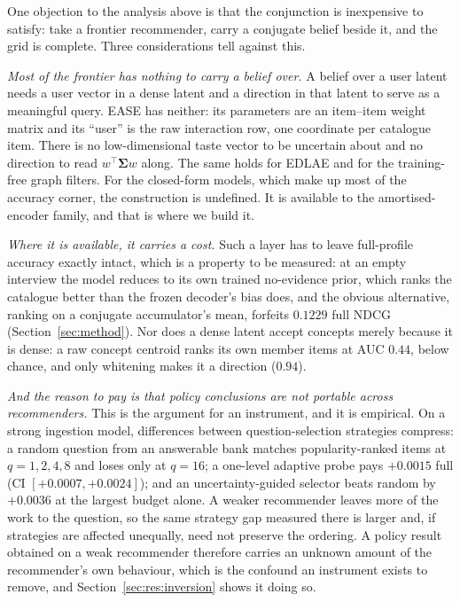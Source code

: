\documentclass[manuscript,screen,review]{acmart}
\newcommand{\bSigma}{\boldsymbol{\Sigma}}
\begin{document}
One objection to the analysis above is that the conjunction is inexpensive to satisfy: take a frontier recommender, carry a conjugate belief beside it, and the grid is complete. Three considerations tell against this.

\emph{Most of the frontier has nothing to carry a belief over.} A belief over a user latent needs a user vector in a dense latent and a direction in that latent to serve as a meaningful query. EASE has neither: its parameters are an item--item weight matrix and its ``user'' is the raw interaction row, one coordinate per catalogue item. There is no low-dimensional taste vector to be uncertain about and no direction to read $w^\top\bSigma w$ along. The same holds for EDLAE and for the training-free graph filters. For the closed-form models, which make up most of the accuracy corner, the construction is undefined. It is available to the amortised-encoder family, and that is where we build it.

\emph{Where it is available, it carries a cost.} Such a layer has to leave full-profile accuracy exactly intact, which is a property to be measured: at an empty interview the model reduces to its own trained no-evidence prior, which ranks the catalogue better than the frozen decoder's bias does, and the obvious alternative, ranking on a conjugate accumulator's mean, forfeits $0.1229$ full NDCG (Section~\ref{sec:method}). Nor does a dense latent accept concepts merely because it is dense: a raw concept centroid ranks its own member items at AUC $0.44$, below chance, and only whitening makes it a direction ($0.94$). 

\emph{And the reason to pay is that policy conclusions are not portable across recommenders.} This is the argument for an instrument, and it is empirical. On a strong ingestion model, differences between question-selection strategies compress: a random question from an answerable bank matches popularity-ranked items at $q{=}1,2,4,8$ and loses only at $q{=}16$; a one-level adaptive probe pays $+0.0015$ full (CI $[+0.0007,+0.0024]$); and an uncertainty-guided selector beats random by $+0.0036$ at the largest budget alone. A weaker recommender leaves more of the work to the question, so the same strategy gap measured there is larger and, if strategies are affected unequally, need not preserve the ordering. A policy result obtained on a weak recommender therefore carries an unknown amount of the recommender's own behaviour, which is the confound an instrument exists to remove, and Section~\ref{sec:res:inversion} shows it doing so.
\end{document}
